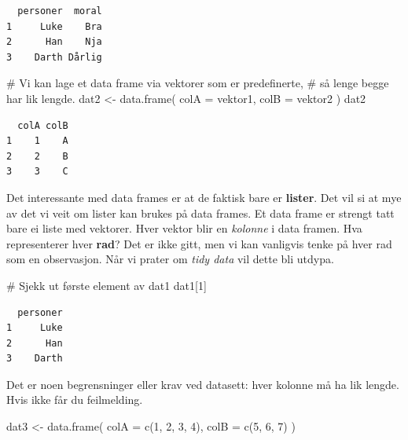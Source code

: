 \documentclass[
  letterpaper,
  DIV=11,
  numbers=noendperiod]{scrartcl}
\newenvironment{Shaded}{\begin{snugshade}}{\end{snugshade}}
\newcommand{\AttributeTok}[1]{\textcolor[rgb]{0.40,0.45,0.13}{#1}}
\newcommand{\CommentTok}[1]{\textcolor[rgb]{0.37,0.37,0.37}{#1}}
\newcommand{\DecValTok}[1]{\textcolor[rgb]{0.68,0.00,0.00}{#1}}
\newcommand{\FunctionTok}[1]{\textcolor[rgb]{0.28,0.35,0.67}{#1}}
\newcommand{\NormalTok}[1]{\textcolor[rgb]{0.00,0.23,0.31}{#1}}
\newcommand{\OtherTok}[1]{\textcolor[rgb]{0.00,0.23,0.31}{#1}}
\begin{document}
\begin{verbatim}
  personer  moral
1     Luke    Bra
2      Han    Nja
3    Darth Dårlig
\end{verbatim}

\begin{Shaded}
\begin{Highlighting}[]
\CommentTok{\# Vi kan lage et data frame via vektorer som er predefinerte,}
\CommentTok{\# så lenge begge har lik lengde.}
\NormalTok{dat2 }\OtherTok{\textless{}{-}} \FunctionTok{data.frame}\NormalTok{(}
  \AttributeTok{colA =}\NormalTok{ vektor1,}
  \AttributeTok{colB =}\NormalTok{ vektor2}
\NormalTok{)}
\NormalTok{dat2}
\end{Highlighting}
\end{Shaded}

\begin{verbatim}
  colA colB
1    1    A
2    2    B
3    3    C
\end{verbatim}

Det interessante med data frames er at de faktisk bare er
\textbf{lister}. Det vil si at mye av det vi veit om lister kan brukes
på data frames. Et data frame er strengt tatt bare ei liste med
vektorer. Hver vektor blir en \emph{kolonne} i data framen. Hva
representerer hver \textbf{rad}? Det er ikke gitt, men vi kan vanligvis
tenke på hver rad som en observasjon. Når vi prater om \emph{tidy data}
vil dette bli utdypa.

\begin{Shaded}
\begin{Highlighting}[]
\CommentTok{\# Sjekk ut første element av dat1}
\NormalTok{dat1[}\DecValTok{1}\NormalTok{]}
\end{Highlighting}
\end{Shaded}

\begin{verbatim}
  personer
1     Luke
2      Han
3    Darth
\end{verbatim}

Det er noen begrensninger eller krav ved datasett: hver kolonne må ha
lik lengde. Hvis ikke får du feilmelding.

\begin{Shaded}
\begin{Highlighting}[]
\NormalTok{dat3 }\OtherTok{\textless{}{-}} \FunctionTok{data.frame}\NormalTok{(}
  \AttributeTok{colA =} \FunctionTok{c}\NormalTok{(}\DecValTok{1}\NormalTok{, }\DecValTok{2}\NormalTok{, }\DecValTok{3}\NormalTok{, }\DecValTok{4}\NormalTok{),}
  \AttributeTok{colB =} \FunctionTok{c}\NormalTok{(}\DecValTok{5}\NormalTok{, }\DecValTok{6}\NormalTok{, }\DecValTok{7}\NormalTok{)}
\NormalTok{)}
\end{Highlighting}
\end{Shaded}
\end{document}
